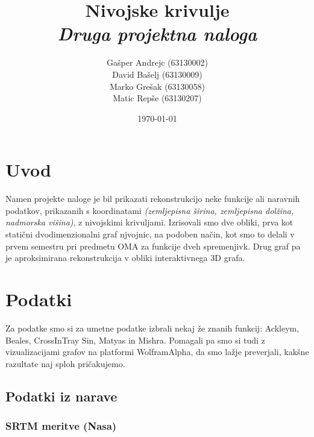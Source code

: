 \documentclass[a4paper,11pt]{article}
\title{\huge{Nivojske krivulje} \\ \Large{\em{Druga projektna naloga}}}
\author{
  Gašper Andrejc (63130002) \\
  David Bašelj (63130009) \\
  Marko Grešak (63130058) \\
  Matic Repše (63130207)
}
\date{\today}
\begin{document}
\maketitle

\section{Uvod}

Namen projekte naloge je bil prikazati rekonstrukcijo neke funkcije ali naravnih podatkov, prikazanih s koordinatami \textit{(zemljepisna širina, zemljepisna dolžina, nadmorska višina)}, z nivojskimi krivuljami. Izrisovali smo dve obliki, prva kot statični dvodimenzionalni graf njvojnic, na podoben način, kot smo to delali v prvem semestru pri predmetu OMA za funkcije dveh spremenjivk. Drug graf pa je aproksimirana rekonstrukcija v obliki interaktivnega 3D grafa.

\section{Podatki}

Za podatke smo si za umetne podatke izbrali nekaj že znanih funkcij: Ackleym, Beales, CrossInTray Sin, Matyas in Mishra. Pomagali pa smo si tudi z vizualizacijami grafov na platformi WolframAlpha, da smo lažje preverjali, kakšne razultate naj sploh pričakujemo.

\subsection{Podatki iz narave}

\subsubsection{SRTM meritve (Nasa)}
\end{document}
